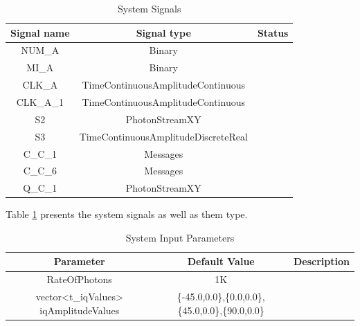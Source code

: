 \begin{table}[H]
\centering
\caption{System Signals}
\label{tb:signals}
\begin{tabular}{|c|c|c|}
\hline
\textbf{Signal name}            & \textbf{Signal type}                      & \textbf{Status} \\ \hline
NUM\_A                          &  Binary                                   &                 \\ \hline
MI\_A                           &  Binary                                   &                 \\ \hline
CLK\_A                          &  TimeContinuousAmplitudeContinuous        &                 \\ \hline
CLK\_A\_1                       &  TimeContinuousAmplitudeContinuous        &                 \\ \hline
S2                              &  PhotonStreamXY                           &                 \\ \hline
S3                              &  TimeContinuousAmplitudeDiscreteReal      &                 \\ \hline
C\_C\_1                         &  Messages                                 &                 \\ \hline
C\_C\_6                         &  Messages                                 &                 \\ \hline
Q\_C\_1                         &  PhotonStreamXY                           &                 \\ \hline

\end{tabular}
\end{table}

Table \ref{tb:signals} presents the system signals as well as them type.

\begin{table}[H]
\centering
\caption{System Input Parameters}
\label{tb:inputparameters}
\begin{tabular}{|c|c|c|}
\hline
\textbf{Parameter}                      & \textbf{Default Value}                                & \textbf{Description} \\ \hline
RateOfPhotons                           & 1K                                                    &                 \\ \hline
vector<t\_iqValues> iqAmplitudeValues   & \{-45.0,0.0\},\{0.0,0.0\},\{45.0,0.0\},\{90.0,0.0\}   &                 \\ \hline

\end{tabular}
\end{table}

